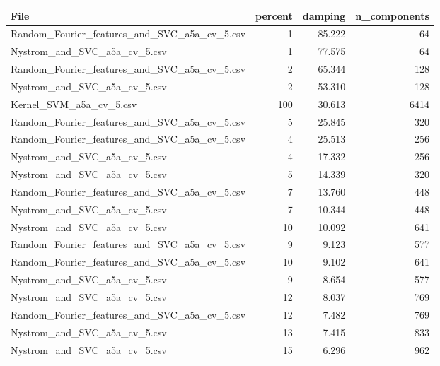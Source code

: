 \begin{tabularx}{\textwidth}{lrrr}
\toprule
                                        File &  percent &  damping &  n\_components \\
\midrule
Random\_Fourier\_features\_and\_SVC\_a5a\_cv\_5.csv &        1 &   85.222 &            64 \\
                Nystrom\_and\_SVC\_a5a\_cv\_5.csv &        1 &   77.575 &            64 \\
Random\_Fourier\_features\_and\_SVC\_a5a\_cv\_5.csv &        2 &   65.344 &           128 \\
                Nystrom\_and\_SVC\_a5a\_cv\_5.csv &        2 &   53.310 &           128 \\
                     Kernel\_SVM\_a5a\_cv\_5.csv &      100 &   30.613 &          6414 \\
Random\_Fourier\_features\_and\_SVC\_a5a\_cv\_5.csv &        5 &   25.845 &           320 \\
Random\_Fourier\_features\_and\_SVC\_a5a\_cv\_5.csv &        4 &   25.513 &           256 \\
                Nystrom\_and\_SVC\_a5a\_cv\_5.csv &        4 &   17.332 &           256 \\
                Nystrom\_and\_SVC\_a5a\_cv\_5.csv &        5 &   14.339 &           320 \\
Random\_Fourier\_features\_and\_SVC\_a5a\_cv\_5.csv &        7 &   13.760 &           448 \\
                Nystrom\_and\_SVC\_a5a\_cv\_5.csv &        7 &   10.344 &           448 \\
                Nystrom\_and\_SVC\_a5a\_cv\_5.csv &       10 &   10.092 &           641 \\
Random\_Fourier\_features\_and\_SVC\_a5a\_cv\_5.csv &        9 &    9.123 &           577 \\
Random\_Fourier\_features\_and\_SVC\_a5a\_cv\_5.csv &       10 &    9.102 &           641 \\
                Nystrom\_and\_SVC\_a5a\_cv\_5.csv &        9 &    8.654 &           577 \\
                Nystrom\_and\_SVC\_a5a\_cv\_5.csv &       12 &    8.037 &           769 \\
Random\_Fourier\_features\_and\_SVC\_a5a\_cv\_5.csv &       12 &    7.482 &           769 \\
                Nystrom\_and\_SVC\_a5a\_cv\_5.csv &       13 &    7.415 &           833 \\
                Nystrom\_and\_SVC\_a5a\_cv\_5.csv &       15 &    6.296 &           962 \\

\end{tabularx}
